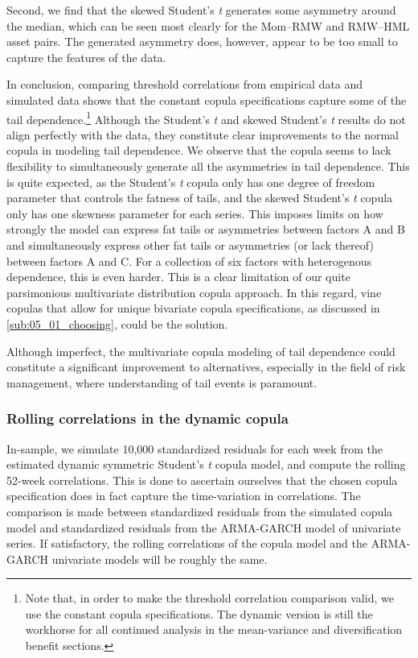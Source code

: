 Second, we find that the skewed Student's \textit{t} generates some asymmetry around the median, which can be seen most clearly for the Mom--RMW and RMW--HML asset pairs. The generated asymmetry does, however, appear to be too small to capture the features of the data.

In conclusion, comparing threshold correlations from empirical data and simulated data shows that the constant copula specifications capture some of the tail dependence.\footnote{Note that, in order to make the threshold correlation comparison valid, we use the constant copula specifications. The dynamic version is still the workhorse for all continued analysis in the mean-variance and diversification benefit sections.} Although the Student's \textit{t} and skewed Student's \textit{t} results do not align perfectly with the data, they constitute clear improvements to the normal copula in modeling tail dependence. We observe that the copula seems to lack flexibility to simultaneously generate all the asymmetries in tail dependence. This is quite expected, as the Student's \textit{t} copula only has one degree of freedom parameter that controls the fatness of tails, and the skewed Student's \textit{t} copula only has one skewness parameter for each series. This imposes limits on how strongly the model can express fat tails or asymmetries between factors A and B and simultaneously express other fat tails or asymmetries (or lack thereof) between factors A and C. For a collection of six factors with heterogenous dependence, this is even harder. This is a clear limitation of our quite parsimonious multivariate distribution copula approach. In this regard, vine copulas that allow for unique bivariate copula specifications, as discussed in \autoref{sub:05_01_choosing}, could be the solution.

Although imperfect, the multivariate copula modeling of tail dependence could constitute a significant improvement to alternatives, especially in the field of risk management, where understanding of tail events is paramount.

\subsubsection{Rolling correlations in the dynamic copula}

In-sample, we simulate 10,000 standardized residuals for each week from the estimated dynamic symmetric Student's \textit{t} copula model, and compute the rolling 52-week correlations. This is done to ascertain ourselves that the chosen copula specification does in fact capture the time-variation in correlations. The comparison is made between standardized residuals from the simulated copula model and standardized residuals from the ARMA-GARCH model of univariate series. If satisfactory, the rolling correlations of the copula model and the ARMA-GARCH univariate models will be roughly the same.

